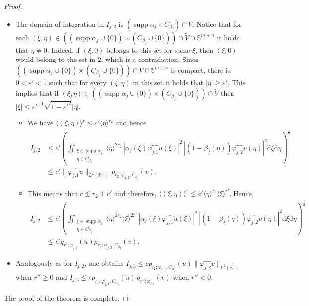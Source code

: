 \documentclass{amsart}
\newcommand{\supp}{\operatorname{supp}}
\theoremstyle{definition}
\begin{document}
\begin{proof}
\begin{itemize}
\item[$\bullet$ \underline{$I_{j,2}$:}]
The domain of integration in $I_{j,2}$ is $(\supp \alpha_j \times C_{\beta_j})\cap\widetilde{V}$. Notice that for each $(\xi,\eta)\in((\supp\alpha_j\cup\{0\})\times(C_{\beta_j}\cup\{0\}))\cap\widetilde{V}\cap\mathbb{S}^{m+n}$ it holds that $\eta\neq 0$. Indeed, if $(\xi,0)$ belongs to this set for some $\xi$, then $(\xi,0)$ would belong to the set in 2. which is a contradiction. Since $((\supp\alpha_j\cup\{0\})\times(C_{\beta_j}\cup\{0\}))\cap\widetilde{V}\cap\mathbb{S}^{m+n}$ is compact, there is $0<\varepsilon'<1$ such that for every $(\xi,\eta)$ in this set it holds that $|\eta|\geq \varepsilon'$. This implies that if $(\xi,\eta)\in ((\supp\alpha_j\cup\{0\})\times(C_{\beta_j}\cup\{0\}))\cap\widetilde{V}$ then $|\xi|\leq \varepsilon'^{-1}\sqrt{1-\varepsilon'^2}|\eta|$.
\begin{itemize}
\item[a) \underline{$r' \geq 0$:}]
We have $\langle (\xi,\eta)\rangle^r\leq c'\langle \eta\rangle^{r_2}$ and hence
\begin{align*}
I_{j,2}
&\leq c' \left( \iint_{ \substack{ \xi \in \supp \alpha_j \\ \eta \in C_{\beta_j} } } \langle \eta \rangle^{2r_2} \, |\alpha_j (\xi) \widehat{\varphi_{j,1} u} (\xi) |^2 \, |(1-\beta_j (\eta)) \widehat{\varphi_{j,2} v} (\eta)|^2 \mathrm{d}\xi \mathrm{d}\eta \right)^{\frac{1}{2}} \\
&\leq c' \lVert \widehat{\varphi_{j,1} u} \rVert_{L^2 (\mathbb{R}^m)} p_{r_2 ; \varphi_{j,2} , C_{\beta_j}} (v) .
\end{align*}
\item[b) \underline{$r' < 0$:}]
This means that $r\leq r_2 + r'$ and therefore, $\langle (\xi , \eta) \rangle^{r} \leq c' \langle \eta \rangle^{r_2} \langle \xi \rangle^{r'}$. Hence,
\begin{align*}
I_{j,2}
&\leq c' \left( \iint_{ \substack{ \xi \in \supp \alpha_j \\ \eta \in C_{\beta_j} } } \langle \eta \rangle^{2r_2} \langle \xi \rangle^{2r'} \, |\alpha_j (\xi) \widehat{\varphi_{j,1} u} (\xi) |^2 \, |(1-\beta_j (\eta)) \widehat{\varphi_{j,2} v} (\eta)|^2 \mathrm{d}\xi \mathrm{d}\eta \right)^{\frac{1}{2}} \\
&\leq c' q_{r'; \varphi_{j,1}} (u) p_{r_2 ; \varphi_{j,2} , C_{\beta_j}} (v) .
\end{align*}
\end{itemize}
\item[$\bullet$ \underline{$I_{j,3}$:}]
Analogously as for $I_{j,2}$, one obtains $I_{j,3} \leq c  p_{r_1; \varphi_{j,1} , C_{\alpha_j}} (u) \lVert \widehat{\varphi_{j,2} v} \rVert_{L^2 (\mathbb{R}^{n})}$ when $r''\geq 0$ and $ I_{j,3} \leq c p_{r_1; \varphi_{j,1} , C_{\alpha_j}} (u) \, q_{r'' ; \varphi_{j,2}} (v)$ when $r'' < 0$.
\end{itemize}
The proof of the theorem is complete.
\end{proof}
\end{document}
